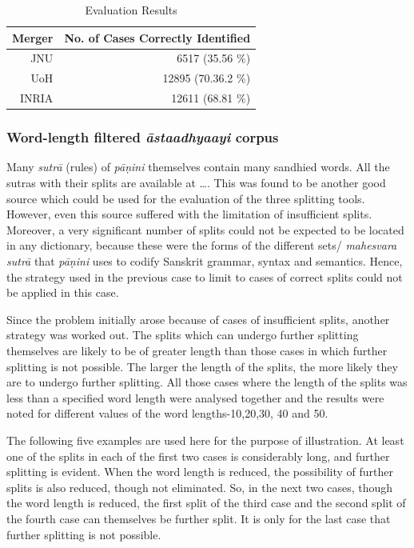 \documentclass[11pt]{article}
\begin{document}
\begin{table}[h]
	\begin{center}
		\begin{tabular}{| r | r | }
			\hline  \bf Merger & \bf No. of Cases Correctly Identified \\
			\hline
			JNU & 6517 (35.56 \%) \\
			UoH & 12895 (70.36.2 \%) \\
			INRIA & 12611 (68.81 \%)\\
			\hline
		\end{tabular}
	\end{center}
	\caption{\label{font-table} Evaluation Results }
\end{table}


\subsubsection{Word-length filtered \textit{\={a}staadhyaayi} corpus}
    Many \textit{sutr\={a}} (rules) of \textit{p\={a}\d{n}ini} themselves contain many sandhied words. All the sutras with their splits are available at …. This was found to be another good source which could be used for the evaluation of the three splitting tools.  However, even this source suffered with the limitation of insufficient splits.  Moreover, a very significant number of splits could not be expected to be located in any dictionary, because these were the forms of the different sets/ \textit{mahesvara sutr\={a}} that \textit{p\={a}\d{n}ini} uses to codify Sanskrit grammar, syntax and semantics. Hence, the strategy used in the previous case to limit to cases of correct splits could not be applied in this case.
    
Since the problem initially arose because of cases of insufficient splits, another strategy was worked out.  The splits which can undergo further splitting themselves are likely to be of greater length than those cases in which further splitting is not possible. The larger the length of the splits, the more likely they are to undergo further splitting. All those cases where the length of the splits was less than a specified word length were analysed together and the results were noted for different values of the word lengths-10,20,30, 40 and 50.

The following five examples are used here for the purpose of illustration. At least one of the splits in each of the first two cases is considerably long, and further splitting is evident.  When the word length is reduced, the possibility of further splits is also reduced, though not eliminated. So, in the next two cases, though the word length is reduced, the first split of the third case and the second split of the fourth case can themselves be further split. It is only for the last case that further splitting is not possible.
\end{document}
